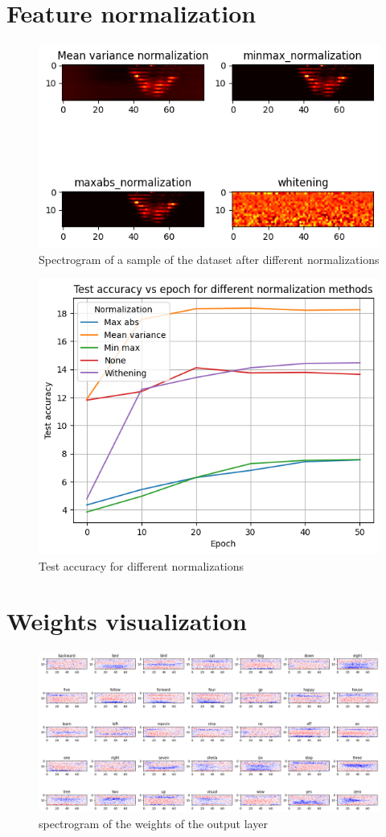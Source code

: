 \documentclass[eng]{class}
\begin{document}
\section{Feature normalization}
\begin{figure}[h]
  \centering
  \includegraphics[width=.8\columnwidth]{images/normalization_spectrogram.png}
  \caption{Spectrogram of a sample of the dataset after different normalizations}
  \label{fig-7}
\end{figure}

\begin{figure}[h]
  \centering
  \includegraphics[width=.8\columnwidth]{images/test_diff_normalizations.png}
  \caption{Test accuracy for different normalizations}
  \label{fig-8}
\end{figure}
\section{Weights visualization}
\begin{figure}[h]
  \centering
  \includegraphics[width=0.8\linewidth]{images/spectrogram_weights.png}
  \caption{spectrogram of the weights of the output layer}
  \label{fig-9}
\end{figure}
\end{document}
